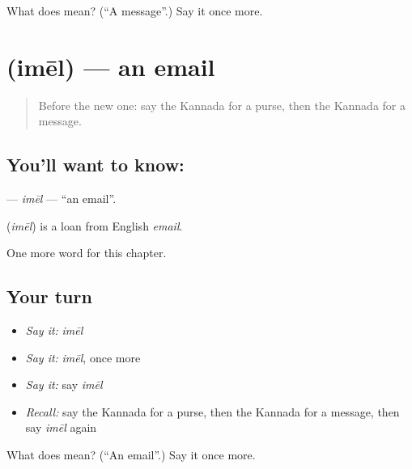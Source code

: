 \begin{tcolorbox}[breakable,colback=teal!4,colframe=teal!35!black,title={Before you move on}]
What does  mean? (\textquotedblleft{}A message\textquotedblright{}.) Say it once more.
\end{tcolorbox}
\section[\texorpdfstring{\kn{ಇಮೇಲ್} (imēl)}{ಇಮೇಲ್ (imēl)}]{ (imēl) — an email}

\label{lesson:KA-C186-imel}



\begin{quote}
Before the new one: say the Kannada for a purse, then the Kannada for a message.
\end{quote}

\subsection*{You'll want to know: }
\textbf{} — \emph{imēl} — \textquotedblleft{}an email\textquotedblright{}.

\begin{cousinweb}
\textbf{} (\emph{imēl}) is a loan from English \emph{email}.
\end{cousinweb}

\begin{grammarlens}[title={What you've built}]
One more word for this chapter.
\end{grammarlens}

\subsection*{Your turn}
\begin{itemize}
\raggedright
  \item \emph{Say it:} \emph{imēl}
  \item \emph{Say it:} \emph{imēl}, once more
  \item \emph{Say it:} say \emph{imēl}
  \item \emph{Recall:} say the Kannada for a purse, then the Kannada for a message, then say \emph{imēl} again
\end{itemize}

\begin{tcolorbox}[breakable,colback=teal!4,colframe=teal!35!black,title={Before you move on}]
What does  mean? (\textquotedblleft{}An email\textquotedblright{}.) Say it once more.
\end{tcolorbox}
